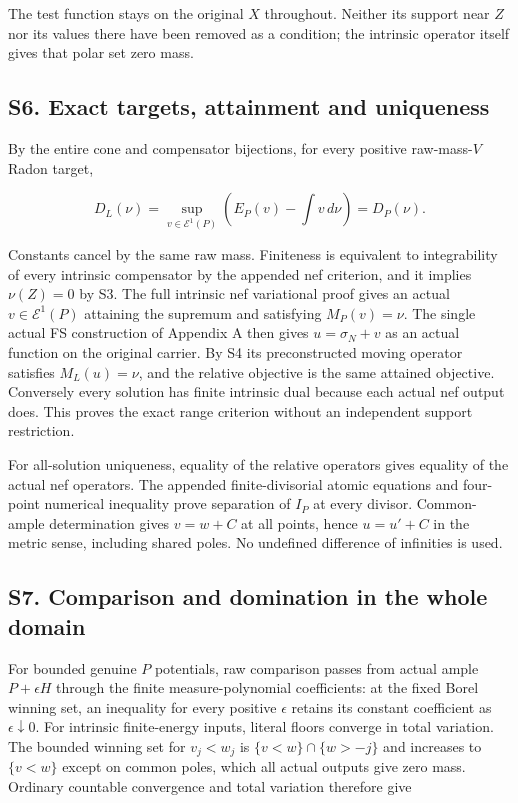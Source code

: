 \documentclass[
  10pt,
]{article}
\begin{document}
The test function stays on the original \(X\) throughout. Neither its
support near \(Z\) nor its values there have been removed as a
condition; the intrinsic operator itself gives that polar set zero mass.

\subsection{S6. Exact targets, attainment and
uniqueness}\label{s6.-exact-targets-attainment-and-uniqueness}

By the entire cone and compensator bijections, for every positive
raw-mass-\(V\) Radon target,

\[D_L(\nu)=\sup_{v\in\mathcal E^1(P)}\left(E_P(v)-\int v\,d\nu\right)=D_P(\nu).\]

Constants cancel by the same raw mass. Finiteness is equivalent to
integrability of every intrinsic compensator by the appended nef
criterion, and it implies \(\nu(Z)=0\) by S3. The full intrinsic nef
variational proof gives an actual \(v\in\mathcal E^1(P)\) attaining the
supremum and satisfying \(M_P(v)=\nu\). The single actual FS
construction of Appendix A then gives \(u=\sigma_N+v\) as an actual
function on the original carrier. By S4 its preconstructed moving
operator satisfies \(M_L(u)=\nu\), and the relative objective is the
same attained objective. Conversely every solution has finite intrinsic
dual because each actual nef output does. This proves the exact range
criterion without an independent support restriction.

For all-solution uniqueness, equality of the relative operators gives
equality of the actual nef operators. The appended finite-divisorial
atomic equations and four-point numerical inequality prove separation of
\(I_P\) at every divisor. Common-ample determination gives \(v=w+C\) at
all points, hence \(u=u'+C\) in the metric sense, including shared
poles. No undefined difference of infinities is used.

\subsection{S7. Comparison and domination in the whole
domain}\label{s7.-comparison-and-domination-in-the-whole-domain}

For bounded genuine \(P\) potentials, raw comparison passes from actual
ample \(P+\epsilon H\) through the finite measure-polynomial
coefficients: at the fixed Borel winning set, an inequality for every
positive \(\epsilon\) retains its constant coefficient as
\(\epsilon\downarrow0\). For intrinsic finite-energy inputs, literal
floors converge in total variation. The bounded winning set for
\(v_j<w_j\) is \(\{v<w\}\cap\{w>-j\}\) and increases to \(\{v<w\}\)
except on common poles, which all actual outputs give zero mass.
Ordinary countable convergence and total variation therefore give
\end{document}
